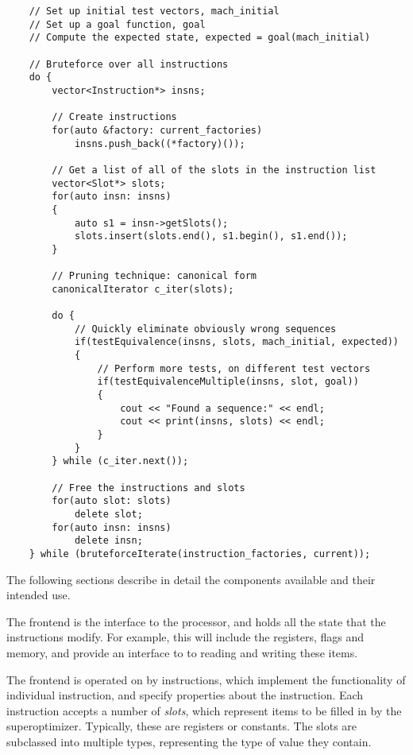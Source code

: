 \documentclass{article}
\begin{document}
\begin{verbatim}
    // Set up initial test vectors, mach_initial
    // Set up a goal function, goal
    // Compute the expected state, expected = goal(mach_initial)

    // Bruteforce over all instructions
    do {
        vector<Instruction*> insns;

        // Create instructions
        for(auto &factory: current_factories)
            insns.push_back((*factory)());

        // Get a list of all of the slots in the instruction list
        vector<Slot*> slots;
        for(auto insn: insns)
        {
            auto s1 = insn->getSlots();
            slots.insert(slots.end(), s1.begin(), s1.end());
        }

        // Pruning technique: canonical form
        canonicalIterator c_iter(slots);

        do {
            // Quickly eliminate obviously wrong sequences
            if(testEquivalence(insns, slots, mach_initial, expected))
            {
                // Perform more tests, on different test vectors
                if(testEquivalenceMultiple(insns, slot, goal))
                {
                    cout << "Found a sequence:" << endl;
                    cout << print(insns, slots) << endl;
                }
            }
        } while (c_iter.next());

        // Free the instructions and slots
        for(auto slot: slots)
            delete slot;
        for(auto insn: insns)
            delete insn;
    } while (bruteforceIterate(instruction_factories, current));

\end{verbatim}

The following sections describe in detail the components available and their intended use.

The frontend is the interface to the processor, and holds all the state that the instructions modify. For example, this will include the registers, flags and memory, and provide an interface to to reading and writing these items.

The frontend is operated on by instructions, which implement the functionality of individual instruction, and specify properties about the instruction. Each instruction accepts a number of \textit{slots}, which represent items to be filled in by the superoptimizer. Typically, these are registers or constants. The slots are subclassed into multiple types, representing the type of value they contain.
\end{document}
